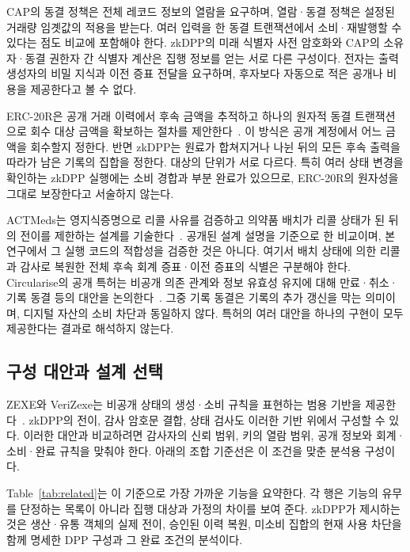 CAP의 동결 정책은 전체 레코드 정보의 열람을 요구하며,
열람·동결 정책은 설정된 거래량 임곗값의 적용을 받는다. 여러
입력을 한 동결 트랜잭션에서 소비·재발행할 수 있다는 점도 비교에
포함해야 한다. zkDPP의 미래 식별자 사전 암호화와 CAP의 소유자·동결
권한자 간 식별자 계산은 집행 정보를 얻는 서로 다른 구성이다.
전자는 출력 생성자의 비밀 지식과 이전 증표 전달을 요구하며,
후자보다 자동으로 적은 공개나 비용을 제공한다고 볼 수 없다.

ERC-20R은 공개 거래 이력에서 후속 금액을 추적하고 하나의 원자적
동결 트랜잭션으로 회수 대상 금액을 확보하는 절차를
제안한다~\cite{wang-erc20r-2022}. 이 방식은 공개 계정에서 어느 금액을 회수할지 정한다.
반면 zkDPP는 원료가 합쳐지거나 나뉜 뒤의 모든 후속 출력을
따라가 남은 기록의 집합을 정한다. 대상의 단위가 서로 다르다. 특히 여러
상태 변경을 확인하는 zkDPP 실행에는 소비 경합과 부분 완료가 있으므로,
ERC-20R의 원자성을 그대로 보장한다고 서술하지 않는다.

ACTMeds는 영지식증명으로 리콜 사유를 검증하고 의약품 배치가
리콜 상태가 된 뒤의 전이를 제한하는 설계를 기술한다~\cite{sitaula-actmeds-2026}.
공개된 설계 설명을 기준으로 한 비교이며, 본 연구에서 그 실행 코드의
적합성을 검증한 것은 아니다. 여기서 배치 상태에 의한 리콜과
감사로 복원한 전체 후속 회계 증표·이전 증표의 식별은 구분해야 한다.
Circularise의 공개 특허는 비공개 의존 관계와 정보 유효성 유지에 대해
만료·취소·기록 동결 등의 대안을 논의한다~\cite{circularise-wo2025056975-2025}.
그중 기록 동결은 기록의 추가 갱신을 막는 의미이며, 디지털 자산의
소비 차단과 동일하지 않다. 특허의 여러 대안을 하나의 구현이 모두
제공한다는 결과로 해석하지 않는다.

\subsection{구성 대안과 설계 선택}
\label{sec:composed-baseline}

ZEXE와 VeriZexe는 비공개 상태의 생성·소비 규칙을 표현하는 범용
기반을 제공한다~\cite{bowe-zexe-2020,xiong-verizexe-2023}.
zkDPP의 전이, 감사 암호문 결합, 상태 검사도 이러한 기반 위에서
구성할 수 있다. 이러한 대안과 비교하려면 감사자의 신뢰 범위,
키의 열람 범위, 공개 정보와 회계·소비·완료 규칙을 맞춰야 한다.
아래의 조합 기준선은 이 조건을 맞춘 분석용 구성이다.

Table~\ref{tab:related}는 이 기준으로 가장 가까운 기능을 요약한다.
각 행은 기능의 유무를 단정하는 목록이 아니라 집행 대상과 가정의
차이를 보여 준다. zkDPP가 제시하는 것은 생산·유통 객체의 실제 전이,
승인된 이력 복원, 미소비 집합의 현재 사용 차단을 함께 명세한 DPP
구성과 그 완료 조건의 분석이다.


